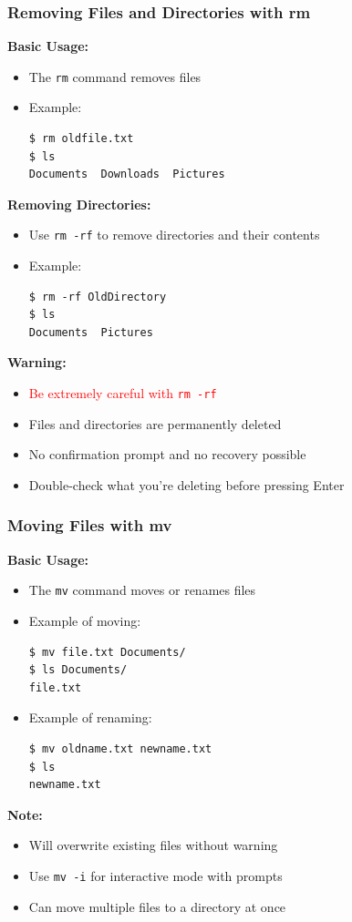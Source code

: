 \documentclass[10pt]{beamer}
\begin{document}
\begin{frame}[fragile]
    \frametitle{Removing Files and Directories with rm}
    
    \textbf{Basic Usage:}
    \begin{itemize}
        \item The \colorbox{gray!20}{\texttt{rm}} command removes files
        \item Example:
\begin{verbatim}
$ rm oldfile.txt
$ ls
Documents  Downloads  Pictures
\end{verbatim}
    \end{itemize}

    \textbf{Removing Directories:}
    \begin{itemize}
        \item Use \colorbox{gray!20}{\texttt{rm -rf}} to remove directories and their contents
        \item Example:
\begin{verbatim}
$ rm -rf OldDirectory
$ ls
Documents  Pictures
\end{verbatim}
    \end{itemize}

    \textbf{Warning:}
    \begin{itemize}
        \item \textcolor{red}{Be extremely careful with \texttt{rm -rf}}
        \item Files and directories are permanently deleted
        \item No confirmation prompt and no recovery possible
        \item Double-check what you're deleting before pressing Enter
    \end{itemize}
\end{frame}

\begin{frame}[fragile]
    \frametitle{Moving Files with mv}
    
    \textbf{Basic Usage:}
    \begin{itemize}
        \item The \colorbox{gray!20}{\texttt{mv}} command moves or renames files
        \item Example of moving:
\begin{verbatim}
$ mv file.txt Documents/
$ ls Documents/
file.txt
\end{verbatim}
        \item Example of renaming:
\begin{verbatim}
$ mv oldname.txt newname.txt
$ ls
newname.txt
\end{verbatim}
    \end{itemize}

    \textbf{Note:}
    \begin{itemize}
        \item Will overwrite existing files without warning
        \item Use \texttt{mv -i} for interactive mode with prompts
        \item Can move multiple files to a directory at once
    \end{itemize}
\end{frame}
\end{document}
